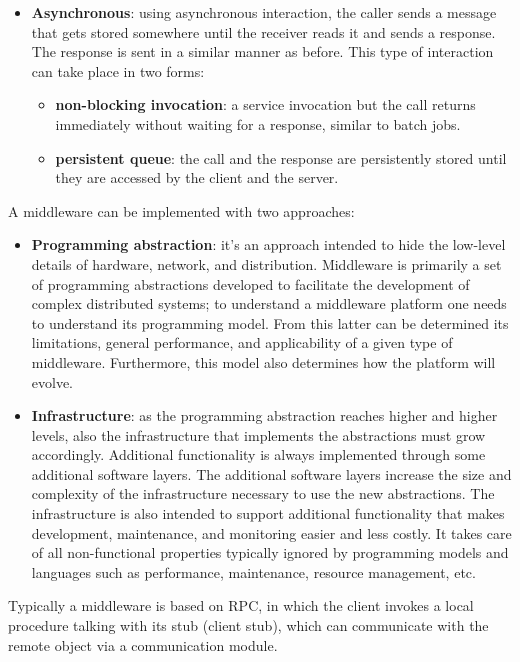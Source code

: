 \begin{itemize}
\begin{itemize}
          \end{itemize}
    \item \textbf{Asynchronous}: using asynchronous interaction, the caller sends a message that gets stored somewhere until the receiver reads it and sends a response. The response is sent in a similar manner as before. This type of interaction can take place in two forms:
          \begin{itemize}
              \item \textbf{non-blocking invocation}: a service invocation but the call returns immediately without waiting for a response, similar to batch jobs.
              \item \textbf{persistent queue}: the call and the response are persistently stored until they are accessed by the client and the server.
          \end{itemize}
\end{itemize}
A middleware can be implemented with two approaches:
\begin{itemize}
    \item \textbf{Programming abstraction}: it's an approach intended to hide the low-level details of hardware, network, and distribution. Middleware is primarily a set of programming abstractions developed to facilitate the development of complex distributed systems; to understand a middleware platform one needs to understand its programming model. From this latter can be determined its limitations, general performance, and applicability of a given type of middleware. Furthermore, this model also determines how the platform will evolve.
    \item \textbf{Infrastructure}: as the programming abstraction reaches higher and higher levels, also the infrastructure that implements the abstractions must grow accordingly. Additional functionality is always implemented through some additional software layers. The additional software layers increase the size and complexity of the infrastructure necessary to use the new abstractions. The infrastructure is also intended to support additional functionality that makes development, maintenance, and monitoring easier and less costly. It takes care of all non-functional properties typically ignored by programming models and languages such as performance, maintenance, resource management, etc.
\end{itemize}
Typically a middleware is based on RPC, in which the client invokes a local procedure talking with its stub (client stub), which can communicate with the remote object via a communication module.
